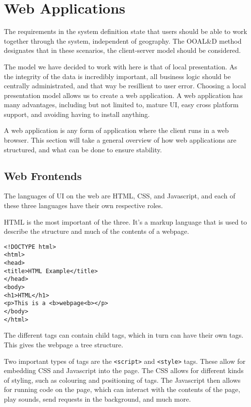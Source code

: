 \section{Web Applications}
The requirements in the system definition state that users should be able to work together through the system, independent of geography.
The OOAL\&D method designates that in these scenarios, the client-server model should be considered.

The model we have decided to work with here is that of local presentation.
As the integrity of the data is incredibly important, all business logic should be centrally administrated, and that way be resillient to user error.
Choosing a local presentation model allows us to create a web application.
A web application has many advantages, including but not limited to, mature UI, easy cross platform support, and avoiding having to install anything.

A web application is any form of application where the client runs in a web browser.
This section will take a general overview of how web applications are structured, and what can be done to ensure stability.


\subsection{Web Frontends}
The languages of UI on the web are HTML, CSS, and Javascript, and each of these three languages have their own respective roles.\cite{nixonweb}

HTML is the most important of the three.
It's a markup language that is used to describe the structure and much of the contents of a webpage.
\begin{lstlisting}
<!DOCTYPE html>
<html>
<head>
<title>HTML Example</title>
</head>
<body>
<h1>HTML</h1>
<p>This is a <b>webpage<b></p>
</body>
</html>
\end{lstlisting}
The different tags can contain child tags, which in turn can have their own tags.
This gives the webpage a tree structure.

Two important types of tags are the \texttt{<script>} and \texttt{<style>} tags.
These allow for embedding CSS and Javascript into the page.
The CSS allows for different kinds of styling, such as colouring and positioning of tags.
The Javascript then allows for running code on the page, which can interact with the contents of the page, play sounds, send requests in the background, and much more.\cite{nixonweb}
